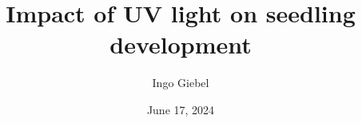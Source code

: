 \documentclass[
11pt,
fleqn,
titlepage]{article}
\title{Impact of UV light on \plant[g]{Cs} seedling development}
\author{Ingo Giebel}
\affil{QBio403: Developmental Biology}
\affil{Heinrich-Heine-Universität Düsseldorf}
\affil{Prof. Dr. Guido Grossmann}
\date{June 17, 2024}
\begin{document}
    \maketitle

    \tableofcontents

    \renewcommand*\listfigurename{List of figures}
    \listoffigures

    \clearpage

    

    

    

    

    \clearpage
    \printbibliography[heading=bibintoc]

    \printindex
\end{document}

